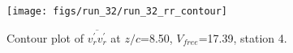 \begin{figure}[H]
\centering
\texttt{[image: figs/run\_32/run\_32\_rr\_contour]}
\caption{Contour plot of $\overline{v_{r}^{\prime} v_{r}^{\prime}}$ at $z/c$=8.50, $V_{free}$=17.39, station 4.}
\label{fig:run_32_rr_contour}
\end{figure}


